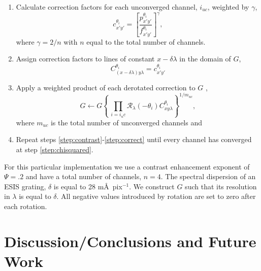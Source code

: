 \begin{enumerate}
    		\item Calculate correction factors for each unconverged channel, $i_{uc}$, weighted by $\gamma$, 
	    		\begin{equation} \label{eq:correctionfactor}
		    		c^{\theta_i}_{x'y'} = \left[\frac{p^{\theta_i}_{x'y'}}{f^{\theta_i}_{x'y'}}\right]^\gamma,
	    		\end{equation}
	    	where $\gamma = 2/n$ with $n$ equal to the total number of channels.
	    		
	    	\item Assign correction factors to lines of constant $x-\delta\lambda$ in the domain of $G$,
	    		\begin{equation}
		    		C^{\theta_i}_{(x-\delta\lambda)y\lambda} = c^{\theta_i}_{x'y'}
	    		\end{equation}	
    		
    		\item \label{step:correct} Apply a weighted product of each derotated correction to $G$ ,
	    		\begin{equation}\label{eq:correct}
	    		G \leftarrow G\left\lbrace  \,\prod_{i=i_uc}  \mathcal{R}_\lambda(-\theta_i)C^{\theta_i}_{xy\lambda} \right\rbrace^{1/m_{uc}},
	    		\end{equation}
    		where $m_{uc}$ is the total number of unconverged channels and 
    		
    		\item Repeat steps \ref{step:contrast}-\ref{step:correct}
    		until every channel has converged at step \ref{step:chisquared}.
    	\end{enumerate}
    	For this particular implementation we use a contrast enhancement exponent of $\Psi = .2$ and have a total number of channels, $n=4$.
    	The spectral dispersion of an ESIS grating, $\delta$ is equal to 28 m\AA\ pix$^{-1}$. 
    	We construct $G$ such that its resolution  in $\lambda$ is equal to $\delta$.
    	All negative values introduced by rotation are set to zero after each rotation.
    	
    	
    
    	
    	
    	
\section{Discussion/Conclusions and Future Work}

